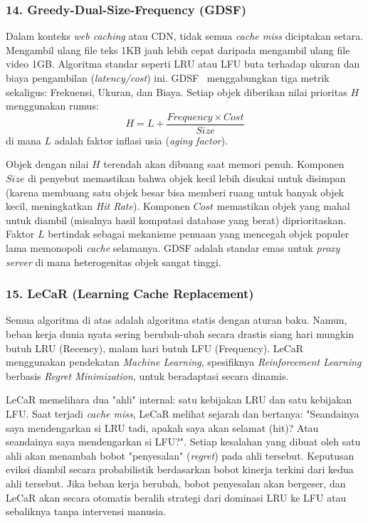 \subsubsection{14. Greedy-Dual-Size-Frequency (GDSF)}
Dalam konteks \textit{web caching} atau CDN, tidak semua
\textit{cache miss} diciptakan setara.
Mengambil ulang file teks 1KB jauh lebih cepat daripada mengambil
ulang file video 1GB.
Algoritma standar seperti LRU atau LFU buta terhadap ukuran dan biaya
pengambilan (\textit{latency/cost}) ini.
GDSF~\cite{Cherkasova1998GDSF} menggabungkan tiga metrik sekaligus:
Frekuensi, Ukuran, dan Biaya.
Setiap objek diberikan nilai prioritas $H$ menggunakan rumus:
\[ H = L + \frac{Frequency \times Cost}{Size} \]
di mana $L$ adalah faktor inflasi usia (\textit{aging factor}).

Objek dengan nilai $H$ terendah akan dibuang saat memori penuh.
Komponen $Size$ di penyebut memastikan bahwa objek kecil lebih
disukai untuk disimpan (karena membuang satu objek besar bisa memberi
ruang untuk banyak objek kecil, meningkatkan \textit{Hit Rate}).
Komponen $Cost$ memastikan objek yang mahal untuk diambil (misalnya
hasil komputasi database yang berat) diprioritaskan.
Faktor $L$ bertindak sebagai mekanisme penuaan yang mencegah objek
populer lama memonopoli \textit{cache} selamanya.
GDSF adalah standar emas untuk \textit{proxy server} di mana
heterogenitas objek sangat tinggi.

\subsubsection{15. LeCaR (Learning Cache Replacement)}
Semua algoritma di atas adalah algoritma statis dengan aturan baku.
Namun, beban kerja dunia nyata sering berubah-ubah secara drastis
siang hari mungkin butuh LRU (Recency), malam hari butuh LFU (Frequency).
LeCaR~\cite{Vietri2018LeCaR} menggunakan pendekatan \textit{Machine
Learning}, spesifiknya \textit{Reinforcement Learning} berbasis
\textit{Regret Minimization}, untuk beradaptasi secara dinamis.

LeCaR memelihara dua "ahli" internal: satu kebijakan LRU dan satu kebijakan LFU.
Saat terjadi \textit{cache miss}, LeCaR melihat sejarah dan bertanya:
"Seandainya saya mendengarkan si LRU tadi, apakah saya akan selamat
(hit)? Atau seandainya saya mendengarkan si LFU?".
Setiap kesalahan yang dibuat oleh satu ahli akan menambah bobot
"penyesalan" (\textit{regret}) pada ahli tersebut.
Keputusan eviksi diambil secara probabilistik berdasarkan bobot
kinerja terkini dari kedua ahli tersebut.
Jika beban kerja berubah, bobot penyesalan akan bergeser, dan LeCaR
akan secara otomatis beralih strategi dari dominasi LRU ke LFU atau
sebaliknya tanpa intervensi manusia.

